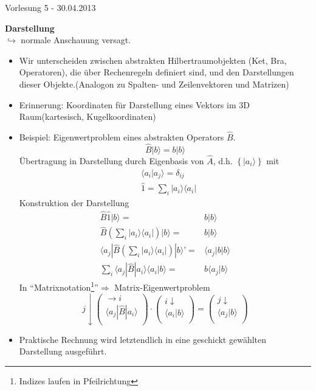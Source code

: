 \documentclass[10pt,article,colorback,accentcolor=tud9d]{scrartcl}
\begin{document}
\begin{flushright}
Vorlesung 5 - 30.04.2013
\end{flushright}
\textbf{Darstellung}\\
$\hookrightarrow$ normale Anschauung versagt.
\begin{itemize}
	\item Wir unterscheiden zwischen abstrakten Hilbertraumobjekten (Ket, Bra, Operatoren), die über Rechenregeln definiert sind, und den Darstellungen dieser Objekte.(Analogon zu Spalten- und Zeilenvektoren und Matrizen)
  \item Erinnerung: Koordinaten für Darstellung eines Vektors im 3D Raum(kartesisch, Kugelkoordinaten)
  \item Beispiel: Eigenwertproblem eines abstrakten Operators $\hat{B}$.
    \begin{equation}
    \hat{B}|b\rangle =b|b\rangle
    \end{equation}
    Übertragung in Darstellung durch Eigenbasis von $\hat{A}$, d.h. $\left\{|a_i\rangle\right\}$ mit
    \begin{equation}
    \begin{aligned}
    &\langle a_i|a_j\rangle=\delta_{ij}\\
    &\hat{1}=\sum_i|a_i\rangle\langle a_i|
    \end{aligned}
    \end{equation}
    Konstruktion der Darstellung
    \begin{equation}
    \begin{aligned}
      \hat{B}\hat{1}|b\rangle=&b|b\rangle\\
      \hat{B}\left(\sum_i|a_i\rangle\langle a_i|\right)|b\rangle=&b|b\rangle\\
      \langle a_j|\hat{B}\left(\sum_i|a_i\rangle\langle a_i|\right)|b\rangle’=&\langle a_j|b|b\rangle\\
      \sum_i\langle a_j|\hat{B}|a_i\rangle\langle a_i|b\rangle =&b\langle a_j|b\rangle      
    \end{aligned}
    \end{equation}
  In "`Matrixnotation\footnote{Indizes laufen in Pfeilrichtung}"'$\Rightarrow$ Matrix-Eigenwertproblem 
  \begin{equation}
    j \downarrow \left(\begin{array}{c} \rightarrow i \\ \langle a_j|\hat{B}|a_i\rangle \\ \left.\right.\end{array}\right)\cdot 
    \left(\begin{array}{c} i \downarrow \\ \langle a_i|b\rangle \\ \left.\right.\end{array}\right)=
    \left(\begin{array}{c} j \downarrow \\ \langle a_j|b\rangle \\ \left.\right.\end{array}\right)
  \end{equation}
\item Praktische Rechnung wird letztendlich in eine geschickt gewählten Darstellung ausgeführt.
\end{itemize}
\end{document}
